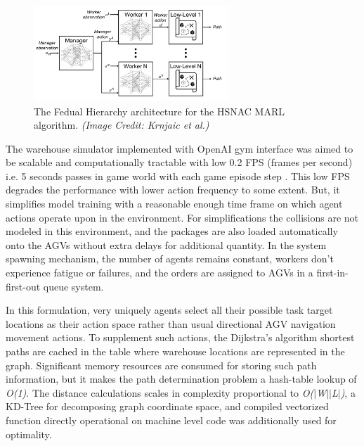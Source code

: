 \documentclass{article}
\begin{document}
\begin{figure}[h]
    \centering
    \includegraphics[width=0.65\textwidth]{hsnac-diagram.png}
    \caption{The Fedual Hierarchy architecture for the HSNAC MARL algorithm. \textit{(Image Credit: Krnjaic et al.)}}
    \label{fig:hsnac-dia}
\end{figure}


The warehouse simulator implemented with OpenAI gym interface was aimed to be scalable and computationally tractable with low 0.2 FPS (frames per second) i.e. 5 seconds passes in game world with each game episode step \cite{brockman2016openai}.
This low FPS degrades the performance with lower action frequency to some extent.
But, it simplifies model training with a reasonable enough time frame on which agent actions operate upon in the environment.
For simplifications the collisions are not modeled in this environment, and the packages are also loaded automatically onto the AGVs without extra delays for additional quantity.
In the system spawning mechanism, the number of agents remains constant, workers don’t experience fatigue or failures, and the orders are assigned to AGVs in a first-in-first-out queue system.


In this formulation, very uniquely agents select all their possible task target locations as their action space rather than usual directional AGV navigation movement actions.
To supplement such actions, the Dijkstra’s algorithm shortest paths are cached in the table where warehouse locations are represented in the graph.
Significant memory resources are consumed for storing such path information, but it makes the path determination problem a hash-table lookup of \textit{O(1)}.
The distance calculations scales in complexity proportional to \textit{O($|$W$|$$|$L$|$)}, a KD-Tree for decomposing graph coordinate space, and compiled vectorized function directly operational on machine level code was additionally used for optimality.
\end{document}
